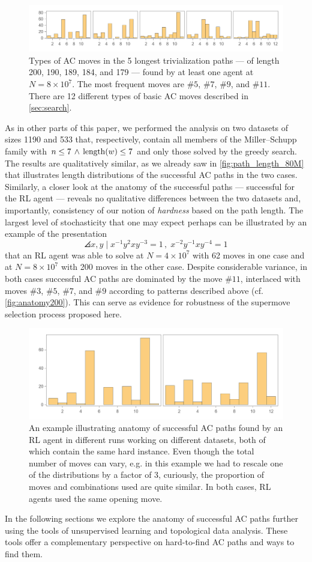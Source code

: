 \begin{figure}[h]
    \centering
	\includegraphics[scale=0.6]{fig/anatomy_some.png}
	\caption{Types of AC moves in the 5 longest trivialization paths --- of length 200, 190, 189, 184, and 179 --- found by at least one agent at $N=8 \times 10^7$. The most frequent moves are $\# 5$, $\# 7$, $\# 9$, and $\# 11$. There are 12 different types of basic AC moves described in \autoref{sec:search}.}
	\label{fig:anatomy_some}
\end{figure}

As in other parts of this paper, we performed the analysis on two datasets of sizes 1190 and 533 that, respectively, contain all members of the Miller–Schupp family with $n \leq 7 \, \land \, \operatorname{length}(w) \leq 7$ and only those solved by the greedy search. The results are qualitatively similar, as we already saw in \autoref{fig:path_length_80M} that illustrates length distributions of the successful AC paths in the two cases. Similarly, a closer look at the anatomy of the successful paths --- successful for the RL agent --- reveals no qualitative differences between the two datasets and, importantly, consistency of our notion of \textit{hardness} based on the path length. The largest level of stochasticity that one may expect perhaps can be illustrated by an example of the presentation
\[
\angles{x, y \mid x^{-1} y^2 x y^{-3} =1 \,, \; x^{-2} y^{-1} x y^{-4} =1 }
\]
that an RL agent was able to solve at $N=4 \times 10^7$ with 62 moves in one case and at $N=8 \times 10^7$ with 200 moves in the other case. Despite considerable variance, in both cases successful AC paths are dominated by the move $\# 11$, interlaced with moves $\# 3$, $\# 5$, $\# 7$, and $\# 9$ according to patterns described above (cf. \autoref{fig:anatomy200}). This can serve as evidence for robustness of the supermove selection process proposed here.

\begin{figure}[h]
    \centering
	\includegraphics[scale=0.55]{fig/anatomy200.png}
	\caption{An example illustrating anatomy of successful AC paths found by an RL agent in different runs working on different datasets, both of which contain the same hard instance. Even though the total number of moves can vary, e.g. in this example we had to rescale one of the distributions by a factor of 3, curiously, the proportion of moves and combinations used are quite similar. In both cases, RL agents used the same opening move.}
	\label{fig:anatomy200}
\end{figure}

In the following sections we explore the anatomy of successful AC paths further using the tools of unsupervised learning and topological data analysis. These tools offer a complementary perspective on hard-to-find AC paths and ways to find them.
